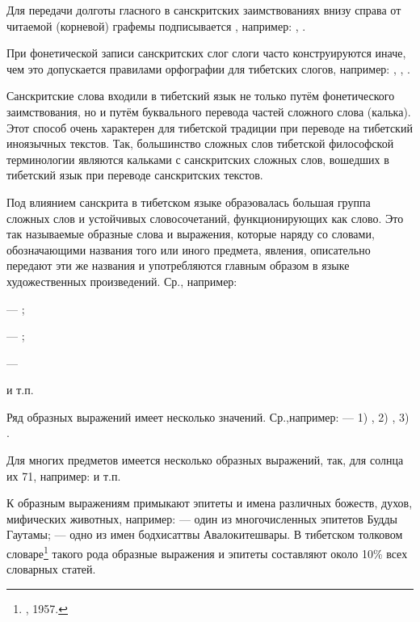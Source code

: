 Для передачи долготы гласного в санскритских заимствованиях внизу справа от читаемой (корневой) графемы подписывается , например: , .

При фонетической записи санскритских слог слоги часто конструируются иначе, чем это допускается правилами орфографии для тибетских слогов, например: , , .

Санскритские слова входили в тибетский язык не только путём фонетического заимствования, но и путём буквального перевода частей сложного слова (калька). Этот способ очень характерен для тибетской традиции при переводе на тибетский иноязычных текстов. Так, большинство сложных слов тибетской философской терминологии являются кальками с санскритских сложных слов, вошедших в тибетский язык при переводе санскритских текстов.

Под влиянием санскрита в тибетском языке обраэовалась большая группа сложных слов и устойчивых словосочетаний, функционирующих как слово. Это так называемые образные слова и выражения, которые наряду со словами, обозначающими названия того или иного предмета, явления, описательно передают эти же названия и употребляются главным образом в языке художественных произведений.
Ср., например:
\begin{prfsample}
	\item {} --- ;
	\item {} --- ;
	\item {} --- 	
\end{prfsample}
 и т.п.

Ряд образных выражений имеет несколько значений. Ср.,например:  --- 1) , 2) , 3) .

Для многих предметов имеется несколько образных выражений, так, для солнца их 71, например:  и т.п.

К образным выражениям примыкают эпитеты и имена различных божеств, духов, мифических животных, например:  --- один из многочисленных эпитетов Будды Гаутамы;	 --- одно из имен бодхисаттвы Авалокитешвары. В тибетском толковом словаре\footnote[18]{, 1957.} такого рода образные выражения и эпитеты составляют около 10\% всех словарных статей.

